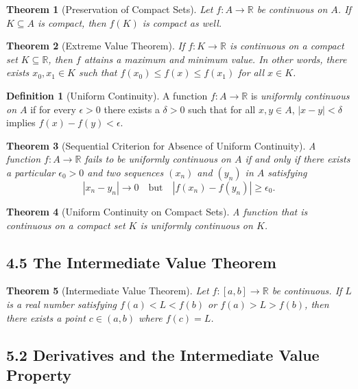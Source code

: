 \documentclass{amsart}
\newtheorem*{theorem}{Theorem}
\theoremstyle{definition}
\newtheorem*{definition}{Definition}
\newcommand{\R}{\mathbb{R}}
\newcommand{\abs}[1]{|#1|}
\begin{document}
\begin{theorem}[Preservation of Compact Sets]
  Let $f : A \to \R$ be continuous on $A$. If $K \subseteq A$ is compact, then
  $f(K)$ is compact as well.
\end{theorem}

\begin{theorem}[Extreme Value Theorem]
  If $f : K \to \R$ is continuous on a compact set $K \subseteq \R$, then $f$
  attains a maximum and minimum value. In other words, there exists $x_0, x_1
  \in K$ such that $f(x_0) \le f(x) \le f(x_1)$ for all $x \in K$.
\end{theorem}

\begin{definition}[Uniform Continuity]
  A function $f : A \to \R$ is \emph{uniformly continuous on $A$} if for every
  $\epsilon > 0$ there exists a $\delta > 0$ such that for all $x, y \in A$,
  $\abs{x - y} < \delta$ implies $f(x) - f(y) < \epsilon$.
\end{definition}

\begin{theorem}[Sequential Criterion for Absence of Uniform Continuity]
  A function $f : A \to \R$ fails to be uniformly continuous on $A$ if and only
  if there exists a particular $\epsilon_0 > 0$ and two sequences $(x_n)$ and
  $(y_n)$ in $A$ satisfying
  \[
    \abs{x_n - y_n} \to 0 \quad \text{but} \quad \abs{f(x_n) - f(y_n)} \ge
    \epsilon_0.
  \]
\end{theorem}

\begin{theorem}[Uniform Continuity on Compact Sets]
  A function that is continuous on a compact set $K$ is uniformly continuous on
  $K$.
\end{theorem}

\subsection*{4.5 The Intermediate Value Theorem}

\begin{theorem}[Intermediate Value Theorem]
  Let $f : [a, b] \to \R$ be continuous. If $L$ is a real number satisfying
  $f(a) < L < f(b)$ or $f(a) > L > f(b)$, then there exists a point $c \in (a,
  b)$ where $f(c) = L$.
\end{theorem}

\subsection*{5.2 Derivatives and the Intermediate Value Property}
\end{document}
